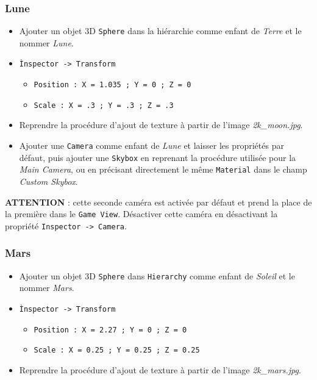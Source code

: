 \documentclass[a4paper,10pt]{article}
\newenvironment{solution}%
{\begin{tcolorbox}[breakable,colback=red!5!white,colframe=red!75!black,title=Solution]}%
{\end{tcolorbox}}
\begin{document}
\begin{solution}
\begin{itemize}
\subsubsection{Lune}
\begin{itemize}
	\item Ajouter un objet 3D \texttt{Sphere} dans la hiérarchie comme enfant de \textit{Terre} et le nommer \textit{Lune}.
	\item \texttt{Ìnspector -> Transform}
	\begin{itemize}
		\item \texttt{Position : X = 1.035 ; Y = 0 ; Z = 0  }
		\item  \texttt{Scale : X = .3 ; Y = .3 ; Z = .3}
	\end{itemize}
	\item Reprendre la procédure d'ajout de texture à partir de l'image \textit{2k\_moon.jpg}.
	\item Ajouter une \texttt{Camera} comme enfant de \textit{Lune} et laisser les propriétés par défaut, puis ajouter une \texttt{Skybox} en reprenant la procédure utilisée pour la \textit{Main Camera}, ou en précisant directement le même \texttt{Material} dans le champ \textit{Custom Skybox}.
\end{itemize}
	\textbf{ATTENTION} : cette seconde caméra est activée par défaut et prend la place de la première dans le \texttt{Game View}. Désactiver cette caméra en désactivant la propriété \texttt{Inspector -> Camera}.

\subsubsection{Mars}
\begin{itemize}
	\item  Ajouter un objet 3D \texttt{Sphere} dans \texttt{Hierarchy} comme enfant de \textit{Soleil} et le nommer \textit{Mars}.
	\item \texttt{Ìnspector -> Transform}
	\begin{itemize}
		\item \texttt{Position : X = 2.27 ; Y = 0 ; Z = 0 }
		\item \texttt{Scale : X = 0.25 ; Y = 0.25 ; Z = 0.25} 
	\end{itemize}
	
	\item Reprendre la procédure d'ajout de texture à partir de l'image \textit{2k\_mars.jpg}.
\end{itemize}


\end{itemize}
\end{solution}
\end{document}
